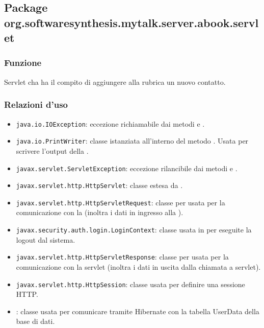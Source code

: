\subsection{Package org.softwaresynthesis.mytalk.server.abook.servlet}\label{sec:call}



\subsubsection*{Funzione}
Servlet cha ha il compito di aggiungere alla rubrica un nuovo contatto.

\subsubsection*{Relazioni d'uso}

\begin{itemize}
	\item \texttt{java.io.IOException}: eccezione richiamabile dai metodi  e .
	\item \texttt{java.io.PrintWriter}: classe istanziata all'interno del metodo . Usata per scrivere l'output della .
	\item \texttt{javax.servlet.ServletException}: eccezione rilancibile dai metodi  e .
	\item \texttt{javax.servlet.http.HttpServlet}: classe estesa da .
	\item \texttt{javax.servlet.http.HttpServletRequest}:  classe per usata per la comunicazione con la  (inoltra i dati in ingresso alla ).
	\item \texttt{javax.security.auth.login.LoginContext}: classe usata in  per eseguite la logout dal sistema.
	\item \texttt{javax.servlet.http.HttpServletResponse}: classe per usata per la comunicazione con la servlet (inoltra i dati in uscita dalla chiamata a servlet).
	\item \texttt{javax.servlet.http.HttpSession}: classe usata per definire una sessione HTTP.
	\item {}: classe usata per comunicare tramite Hibernate con la tabella UserData della base di dati.
\end{itemize}

